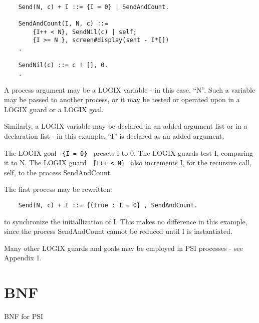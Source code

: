 \begin{verbatim}

    Send(N, c) + I ::= {I = 0} | SendAndCount.

    SendAndCount(I, N, c) ::=
        {I++ < N}, SendNil(c) | self;
        {I >= N }, screen#display(sent - I*[])
    .

    SendNil(c) ::= c ! [], 0.
    .
\end{verbatim}

\noindent
A process argument may be a LOGIX variable - in this case, ``N''.
Such a variable may be passed to another process, or it may be
tested or operated upon in a LOGIX guard or a LOGIX goal.

\noindent
Similarly, a LOGIX variable may be declared in an added argument
list or in a declaration list - in this example, ``I'' is declared
as an added argument.

\noindent
The LOGIX goal \verb+ {I = 0} + presets I to 0.
\noindent
The LOGIX guards test I, comparing it to N.
The LOGIX guard \verb# {I++ < N} # also increments I, for the
recursive call, self, to the process SendAndCount.

\noindent
The first process may be rewritten:

\begin{verbatim}
    Send(N, c) + I ::= {(true : I = 0} , SendAndCount.
\end{verbatim}

\noindent
to synchronize the initiallization of I.  This makes no difference
in this example, since the process SendAndCount cannot be reduced
until I is instantiated.

\noindent
Many other LOGIX guards and goals may be employed in PSI processes -
see \cite{logix:user-man} Appendix 1.

\appendix
\chapter{BNF}
\label{BNF}
BNF for PSI

